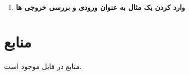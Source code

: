 \documentclass[12pt]{article}
\begin{document}
\begin{enumerate}
    \item {
          \textbf{وارد کردن یک مثال به عنوان ورودی و بررسی خروجی ها}
          }
          \begin{figure}[H]
              \centering
              \begin{center}
              \end{center}
              \caption{}
          \end{figure}
\end{enumerate}

\section{منابع}
\paragraph{}
منابع در فایل  موجود است.
\end{document}

